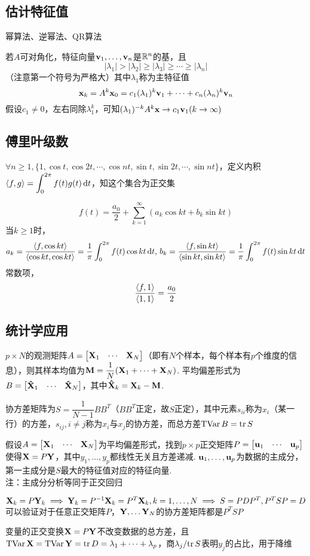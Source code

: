 \subsection{估计特征值}%
幂算法、逆幂法、QR算法
\par 若$A$可对角化，特征向量$\mathbf{v}_1,\dots,\mathbf{v}_n$是$\mathbb{R}^n$的基，且
\[|\lambda_1|>|\lambda_2|\geq|\lambda_3|\geq\cdots\geq|\lambda_n|\]
（注意第一个符号为严格大）其中$\lambda_1$称为主特征值
\[\mathbf{x}_k=A^k\mathbf{x}_0=c_1(\lambda_1)^k\mathbf{v}_1+\cdots+c_n(\lambda_n)^k\mathbf{v}_n\]
假设$c_1\ne 0$，左右同除$\lambda_1^k$，可知$(\lambda_1)^{-k}A^k\mathbf{x}\to c_1\mathbf{v}_1(k\to\infty)$

\subsection{傅里叶级数}%
$\forall n\geq 1,\{1,\cos t,\cos 2t,\cdots,\cos nt,\sin t,\sin 2t,\cdots,\sin nt\}$，定义内积$\langle f,g \rangle=\displaystyle\int_0^{2\pi} f(t)g(t)\,\mathrm{d} t$，知这个集合为正交集
\begin{theorem}
\[f(t)=\dfrac{a_0}{2}+\sum_{k=1}^\infty(a_k\cos kt+b_k\sin kt)\]
当$k\geq 1$时，
\[a_k=\dfrac{\langle f,\cos kt \rangle}{\langle \cos kt,\cos kt \rangle}=\dfrac{1}{\pi}\int_0^{2\pi}f(t)\cos kt\,\mathrm{d} t,\,b_k=\dfrac{\langle f,\sin kt \rangle}{\langle \sin kt,\sin kt \rangle}=\dfrac{1}{\pi}\int_0^{2\pi}f(t)\sin kt\,\mathrm{d} t\]
常数项，
\[\dfrac{\langle f,1 \rangle}{\langle 1,1 \rangle}=\dfrac{a_0}{2}\]
\end{theorem}

\subsection{统计学应用}%
\begin{definition}[平均值]
$p\times N$的观测矩阵$A=\begin{bmatrix}{\mathbf{X}_1}&\cdots&{\mathbf{X}_N}\end{bmatrix}$（即有$N$个样本，每个样本有$p$个维度的信息），则其样本均值为$\mathbf{M}=\dfrac{1}{N}(\mathbf{X}_1+\cdots+\mathbf{X}_N)$. 平均偏差形式为$B=\begin{bmatrix}{\mathbf{\hat{X}}_1}&\cdots&{\mathbf{\hat{X}}_N}\end{bmatrix}$，其中$\mathbf{\hat{X}}_k=\mathbf{X}_k-\mathbf{M}$.
\end{definition}
\begin{definition}[方差]
协方差矩阵为$S=\dfrac{1}{N-1}BB^T$（$BB^T$正定，故$S$正定），其中元素$s_{ii}$称为$x_i$（某一行）的方差，$s_{ij},i\ne j$称为$x_i$与$x_j$的协方差，而总方差$\mathrm{TVar}\, B=\mathrm{tr}\, S$
\end{definition}
\begin{definition}[主成分分析]
假设$A=\begin{bmatrix}{\mathbf{X}_1}&\cdots&{\mathbf{X}_N}\end{bmatrix}$为平均偏差形式，找到$p\times p$正交矩阵$P=\begin{bmatrix}{\mathbf{u}_1}&\cdots&{\mathbf{u}_p}\end{bmatrix}$使得$\mathbf{X}=P\mathbf{Y}$，其中$y_1,\dots,y_p$都线性无关且方差递减. $\mathbf{u}_1,\dots,\mathbf{u}_p$为数据的主成分，第一主成分是$S$最大的特征值对应的特征向量.\\
注：主成分分析等同于正交回归
\end{definition}
\begin{analysis}
$\mathbf{X}_k=P\mathbf{Y}_k\implies \mathbf{Y}_k=P^{-1}\mathbf{X}_k=P^T\mathbf{X}_k,k=1,\dots,N\implies S=PDP^T, P^TSP=D$\\
可以验证对于任意正交矩阵$P$，$\mathbf{Y},\dots\mathbf{Y}_N$的协方差矩阵都是$P^TSP$
\end{analysis}
变量的正交变换$\mathbf{X}=P\mathbf{Y}$不改变数据的总方差，且$\mathrm{TVar}\, \mathbf{X}=\mathrm{TVar}\, \mathbf{Y}=\mathrm{tr}\, D=\lambda_1+\cdots+\lambda_p$，商$\lambda_j/\mathrm{tr}\, S$表明$y_j$的占比，用于降维